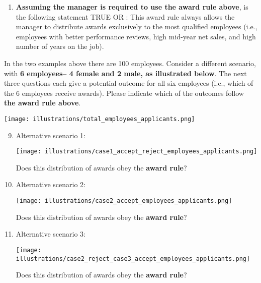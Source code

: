 \documentclass{article}
\newcommand{\correct}[1]{{\color{red}{#1}}}
\newcommand{\correct}[1]{{\color{red}{#1}}}
\begin{document}
\begin{enumerate}
    \item \textbf{Assuming the manager is required to use the award rule above}, is the following statement TRUE OR \correct{FALSE}: This award rule always allows the manager to distribute awards exclusively to the most qualified employees (i.e., employees with better performance reviews, high mid-year net sales, and high number of years on the job).
\end{enumerate}

In the two examples above there are 100 employees. Consider a different scenario, with \textbf{6 employees-- 4 female and 2 male, as illustrated below}. The next three questions each give a potential outcome for all six employees (i.e., which of the 6 employees receive awards). Please indicate which of the outcomes follow \textbf{the award rule above}.

\vspace{10pt}
\texttt{[image: illustrations/total\_employees\_applicants.png]}

\begin{enumerate}
    \setcounter{enumi}{8}
    \item Alternative scenario 1:
    
    \vspace{10pt}
    \texttt{[image: illustrations/case1\_accept\_reject\_employees\_applicants.png]}
    
    Does this distribution of awards obey the \textbf{award rule}? \correct{Yes}
    
    \item Alternative scenario 2:
    
    \vspace{10pt}
    \texttt{[image: illustrations/case2\_accept\_employees\_applicants.png]}
    
    Does this distribution of awards obey the \textbf{award rule}? \correct{No}
    \item Alternative scenario 3:
    
    \vspace{10pt}
    \texttt{[image: illustrations/case2\_reject\_case3\_accept\_employees\_applicants.png]}
    
    Does this distribution of awards obey the \textbf{award rule}? \correct{No}
\end{enumerate}
\end{document}
